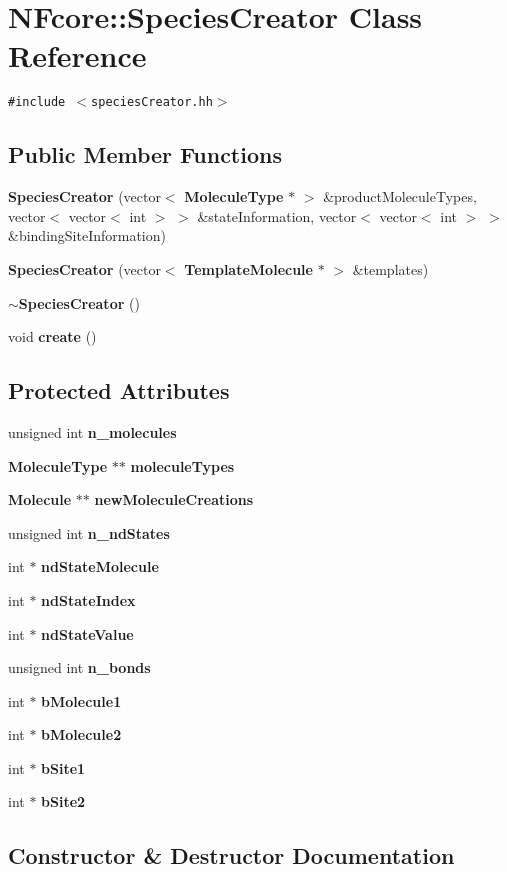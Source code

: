 \section{NFcore::SpeciesCreator Class Reference}
\label{classNFcore_1_1SpeciesCreator}
{\tt \#include $<$speciesCreator.hh$>$}

\subsection*{Public Member Functions}
\begin{CompactItemize}
\item 
{\bf SpeciesCreator} (vector$<$ {\bf MoleculeType} $\ast$ $>$ \&productMoleculeTypes, vector$<$ vector$<$ int $>$ $>$ \&stateInformation, vector$<$ vector$<$ int $>$ $>$ \&bindingSiteInformation)
\item 
{\bf SpeciesCreator} (vector$<$ {\bf TemplateMolecule} $\ast$ $>$ \&templates)
\item 
{\bf $\sim$SpeciesCreator} ()
\item 
void {\bf create} ()
\end{CompactItemize}
\subsection*{Protected Attributes}
\begin{CompactItemize}
\item 
unsigned int {\bf n\_\-molecules}
\item 
{\bf MoleculeType} $\ast$$\ast$ {\bf moleculeTypes}
\item 
{\bf Molecule} $\ast$$\ast$ {\bf newMoleculeCreations}
\item 
unsigned int {\bf n\_\-ndStates}
\item 
int $\ast$ {\bf ndStateMolecule}
\item 
int $\ast$ {\bf ndStateIndex}
\item 
int $\ast$ {\bf ndStateValue}
\item 
unsigned int {\bf n\_\-bonds}
\item 
int $\ast$ {\bf bMolecule1}
\item 
int $\ast$ {\bf bMolecule2}
\item 
int $\ast$ {\bf bSite1}
\item 
int $\ast$ {\bf bSite2}
\end{CompactItemize}


\subsection{Constructor \& Destructor Documentation}
